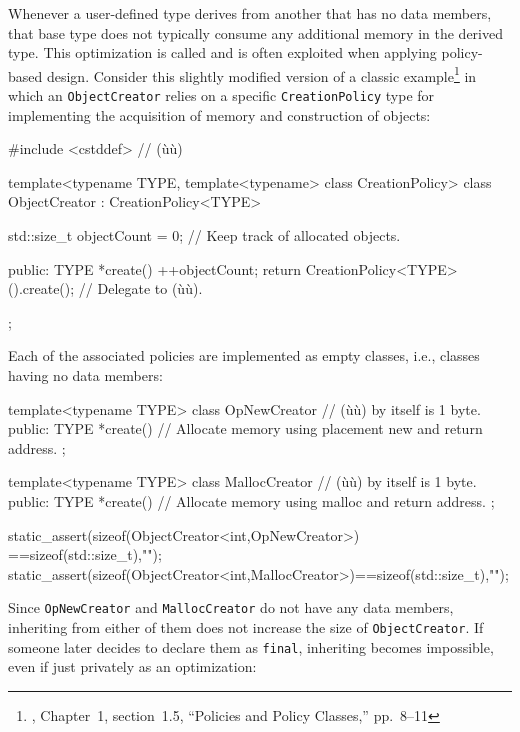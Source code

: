 {Whenever a user-defined type derives from another that has no data
members, that base type does not typically consume any additional memory
in the derived type. This optimization is called  and is often exploited when applying
policy-based design. Consider this slightly modified version of a
classic example{\cprotect\footnote{\cite{alexandrescu01}, Chapter~1, section~1.5, ``Policies and Policy Classes,'' pp.~8--11}} in which an
\lstinline!ObjectCreator! relies on a specific \lstinline!CreationPolicy! type
for implementing the acquisition of memory and construction of objects:

\begin{emcppslisting}[emcppsbatch=e11]
#include <cstddef>  // (ù{}ù)

template<typename TYPE, template<typename> class CreationPolicy>
class ObjectCreator : CreationPolicy<TYPE>
{
    std::size_t objectCount = 0;  // Keep track of allocated objects.

public:
    TYPE *create()
    {
        ++objectCount;
        return CreationPolicy<TYPE>().create();  // Delegate to (ù{}ù).
    }
};
\end{emcppslisting}
    

\noindent Each of the associated policies are implemented as empty classes, i.e.,
classes having no data members:

\begin{emcppslisting}[emcppsbatch=e11]
template<typename TYPE>
class OpNewCreator // (ù{}ù) by itself is 1 byte.
{
public:
    TYPE *create()
    {
        // Allocate memory using placement new and return address.
    }
};

template<typename TYPE>
class MallocCreator // (ù{}ù) by itself is 1 byte.
{
public:
    TYPE *create()
    {
        // Allocate memory using malloc and return address.
    }
};

static_assert(sizeof(ObjectCreator<int,OpNewCreator>) ==sizeof(std::size_t),"");
static_assert(sizeof(ObjectCreator<int,MallocCreator>)==sizeof(std::size_t),"");
\end{emcppslisting}
    

\noindent Since \lstinline!OpNewCreator! and \lstinline!MallocCreator! do not have any
data members, inheriting from either of them does not increase the size
of \lstinline!ObjectCreator!. If someone later decides to declare them as
\lstinline!final!, inheriting becomes impossible, even if just privately as
an optimization:

}
